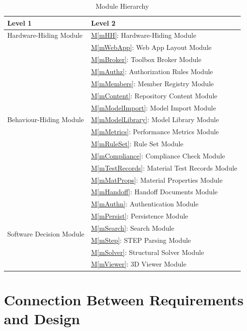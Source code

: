 \documentclass[12pt, titlepage]{article}
\newcommand{\mref}[1]{\hyperref[#1:dec]{M\ref*{#1}}}
\begin{document}
\begin{table}[h!]
\centering
\begin{tabular}{p{} p{}}
\toprule
\textbf{Level 1} & \textbf{Level 2}\\
\midrule


{Hardware-Hiding Module} & \mref{mHH}: Hardware-Hiding Module\\
\midrule
\multirow{13}{0.3\textwidth}{Behaviour-Hiding Module} & \mref{mWebApp}: Web App Layout Module\\
& \mref{mBroker}: Toolbox Broker Module\\
& \mref{mAuthz}: Authorization Rules Module\\
& \mref{mMembers}: Member Registry Module\\
& \mref{mContent}: Repository Content Module\\
& \mref{mModelImport}: Model Import Module\\
& \mref{mModelLibrary}: Model Library Module\\
& \mref{mMetrics}: Performance Metrics Module\\
& \mref{mRuleSet}: Rule Set Module\\
& \mref{mCompliance}: Compliance Check Module\\
& \mref{mTestRecords}: Material Test Records Module\\
& \mref{mMatProps}: Material Properties Module\\
& \mref{mHandoff}: Handoff Documents Module\\
\midrule
\multirow{6}{0.3\textwidth}{Software Decision Module} & \mref{mAuthn}: Authentication Module\\
& \mref{mPersist}: Persistence Module\\
& \mref{mSearch}: Search Module\\
& \mref{mStep}: STEP Parsing Module\\
& \mref{mSolver}: Structural Solver Module\\
& \mref{mViewer}: 3D Viewer Module\\
\bottomrule


\end{tabular}
\caption{Module Hierarchy}
\label{TblMH}
\end{table}

\section{Connection Between Requirements and Design} \label{SecConnection}
\end{document}
